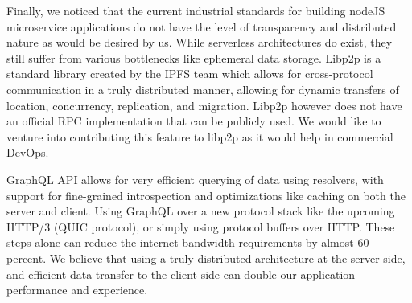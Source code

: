 Finally, we noticed that the current industrial standards for building nodeJS microservice applications do not have the level of transparency and distributed nature as would be desired by us. While serverless architectures do exist, they still suffer from various bottlenecks like ephemeral data storage. Libp2p is a standard library created by the IPFS team which allows for cross-protocol communication in a truly distributed manner, 
allowing for dynamic transfers of location, concurrency, replication, and migration. Libp2p however does not have an official RPC implementation that can be publicly used. We would like to venture into contributing this feature to libp2p as it would help in commercial DevOps.

GraphQL API allows for very efficient querying of data using resolvers, with support for fine-grained introspection and optimizations like caching on both the server and client. Using GraphQL over a new protocol stack like the upcoming HTTP/3 (QUIC protocol), or simply using protocol buffers over 
HTTP. These steps alone can reduce the internet bandwidth requirements by almost 60 percent. We believe that using a truly distributed architecture at the server-side, and efficient data transfer to the client-side can double our application performance and experience.